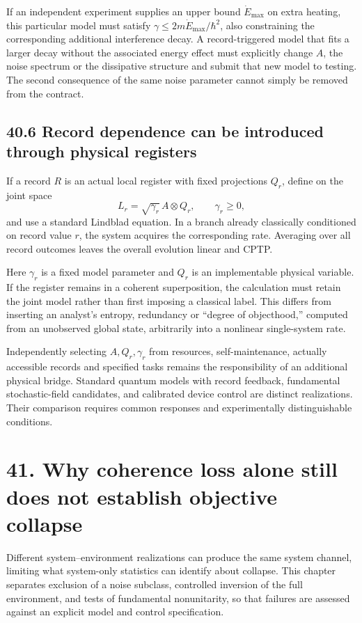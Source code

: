 \documentclass[
  11pt,
  oneside]{book}
\begin{document}
If an independent experiment supplies an upper bound \(\dot E_{\max}\)
on extra heating, this particular model must satisfy
\(\gamma\le2m\dot E_{\max}/\hbar^2\), also constraining the
corresponding additional interference decay. A record-triggered model
that fits a larger decay without the associated energy effect must
explicitly change \(A\), the noise spectrum or the dissipative structure
and submit that new model to testing. The second consequence of the same
noise parameter cannot simply be removed from the contract.

\section{40.6 Record dependence can be introduced through physical
registers}

If a record \(R\) is an actual local register with fixed projections
\(Q_r\), define on the joint space \[
L_r=\sqrt{\gamma_r}\,A\otimes Q_r,\qquad\gamma_r\ge0,
\] and use a standard Lindblad equation. In a branch already classically
conditioned on record value \(r\), the system acquires the corresponding
rate. Averaging over all record outcomes leaves the overall evolution
linear and CPTP.

Here \(\gamma_r\) is a fixed model parameter and \(Q_r\) is an
implementable physical variable. If the register remains in a coherent
superposition, the calculation must retain the joint model rather than
first imposing a classical label. This differs from inserting an
analyst's entropy, redundancy or ``degree of objecthood,'' computed from
an unobserved global state, arbitrarily into a nonlinear single-system
rate.

Independently selecting \(A,Q_r,\gamma_r\) from resources,
self-maintenance, actually accessible records and specified tasks
remains the responsibility of an additional physical bridge. Standard
quantum models with record feedback, fundamental stochastic-field
candidates, and calibrated device control are distinct realizations.
Their comparison requires common responses and experimentally
distinguishable conditions.

\chapter{41. Why coherence loss alone still does not establish objective
collapse}\label{ch-41}

Different system--environment realizations can produce the same system
channel, limiting what system-only statistics can identify about
collapse. This chapter separates exclusion of a noise subclass,
controlled inversion of the full environment, and tests of fundamental
nonunitarity, so that failures are assessed against an explicit model
and control specification.
\end{document}
